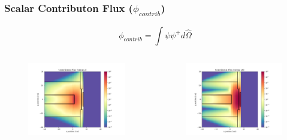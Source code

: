 \documentclass[t]{beamer}
\begin{document}
\begin{frame}
  \frametitle{Scalar Contributon Flux ($\phi_{contrib}$)}
  \vskip-0.25in
  \begin{equation}
    \phi_{contrib} = \int\psi\psi^+d\hat{\Omega}
  \end{equation}
  \vskip-0.25in
  \begin{columns}
    \begin{figure}
      \includegraphics[trim={0.7in 0.15in 1.05in 0.4in},clip,scale=0.36]{images/scalar_flux_con_g02.png}
    \end{figure}
    \begin{figure}
      \includegraphics[trim={0.7in 0.15in 1.05in 0.4in},clip,scale=0.36]{images/scalar_flux_con_g26.png}

\end{figure}
\end{columns}
\end{frame}
\end{document}
